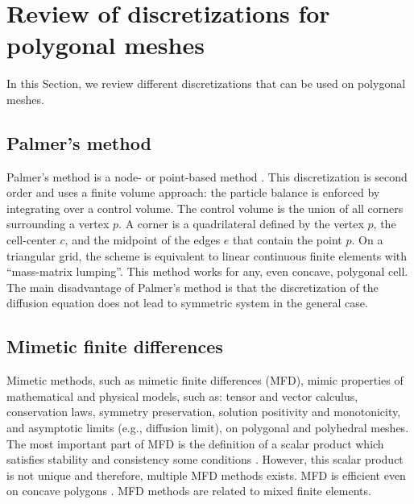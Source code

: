 \section{Review of discretizations for polygonal meshes} \label{sec_review}

In this Section, we review different discretizations that can be used on polygonal
meshes.

\subsection{Palmer's method}

Palmer's method is a node- or point-based method \cite{Palmer2001}. This
discretization is second order and uses a finite volume approach: the
particle balance is enforced by integrating over a control volume. The control 
volume is the union of all corners surrounding a vertex $p$. A corner is a
quadrilateral defined by the vertex $p$, the cell-center $c$, and the midpoint
of the edges $e$ that contain the point $p$. On a triangular grid, the
scheme is equivalent to linear continuous finite elements with ``mass-matrix
lumping''. This method works for any, even concave, polygonal cell. The
main disadvantage of Palmer's method is that the discretization of the
diffusion equation does not lead to symmetric system in the general case.

\subsection{Mimetic finite differences}
Mimetic methods, such as mimetic finite differences (MFD), mimic properties of
mathematical and physical models, such as: tensor and vector calculus,
conservation laws, symmetry preservation, solution positivity and
monotonicity, and asymptotic limits (e.g., diffusion limit), on polygonal and
polyhedral meshes. The most important part of MFD is the definition of a scalar
product which satisfies stability and consistency some conditions
\cite{Brezzi2005}. However, this scalar product is not unique and therefore,
multiple MFD methods exists. MFD is efficient even on concave polygons
\cite{Kuznetsov2004}. MFD methods are related to mixed finite elements.

